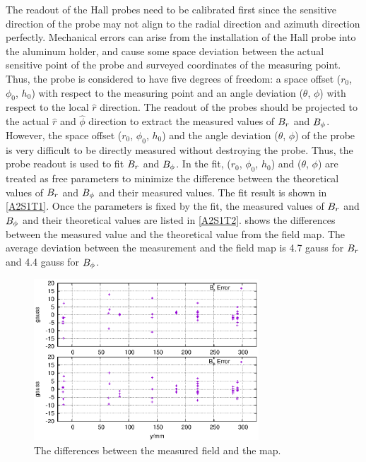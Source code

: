 The readout of the Hall probes need to be calibrated first since the sensitive direction of the probe may not align to the radial direction and azimuth direction perfectly. Mechanical errors can arise from the installation of the Hall probe into the aluminum holder, and cause some space deviation between the actual sensitive point of the probe and surveyed coordinates of the measuring point. Thus, the probe is considered to have five degrees of freedom: a space offset ($r_0$, $\phi_0$, $h_0$) with respect to the measuring point and an angle deviation ($\theta$, $\phi$) with respect to the local $\hat{r}$ direction. The readout of the probes should be projected to the actual $\hat{r}$ and $\hat{\phi}$ direction to extract the measured values of $B_r$ and $B_{\phi}$. However, the space offset ($r_0$, $\phi_0$, $h_0$) and the angle deviation ($\theta$, $\phi$) of the probe is very difficult to be directly measured without destroying the probe. Thus, the probe readout is used to fit $B_r$ and $B_{\phi}$. In the fit, ($r_0$, $\phi_0$, $h_0$) and ($\theta$, $\phi$) are treated as free parameters to minimize the difference between the theoretical values of $B_r$ and $B_{\phi}$ and their measured values. The fit result is shown in \cref{A2S1T1}. Once the parameters is fixed by the fit, the measured values of $B_r$ and $B_{\phi}$ and their theoretical values are listed in \cref{A2S1T2}.  shows the differences between the measured value and the theoretical value from the field map. The average deviation between the measurement and the field map is 4.7 gauss for $B_r$ and 4.4 gauss for $B_{\phi}$.

\begin{figure}[tb!]
  \centering
  \includegraphics[width=0.75\textwidth]{figs/target-field-mapping-error}
  \caption{The differences between the measured field and the map. \label{A2S1F2}}
\end{figure}

